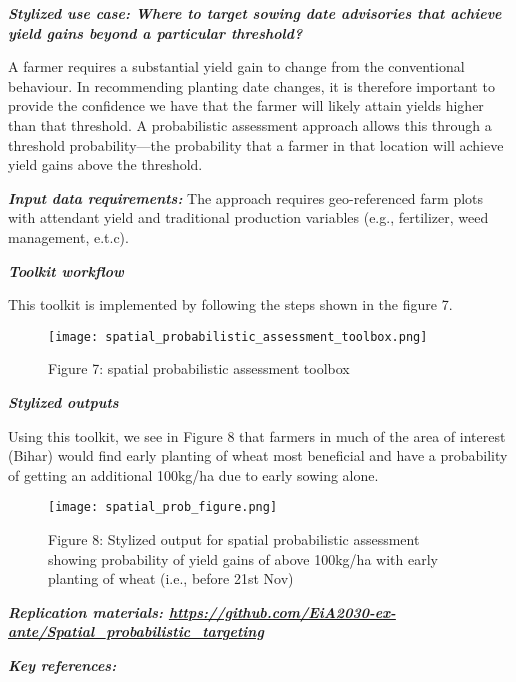 \documentclass[
  letterpaper,
  DIV=11,
  numbers=noendperiod]{scrreprt}
\begin{document}
\textbf{\emph{Stylized use case: Where to target sowing date advisories
that achieve yield gains beyond a particular threshold?}}

A farmer requires a substantial yield gain to change from the
conventional behaviour. In recommending planting date changes, it is
therefore important to provide the confidence we have that the farmer
will likely attain yields higher than that threshold. A probabilistic
assessment approach allows this through a threshold probability---the
probability that a farmer in that location will achieve yield gains
above the threshold.

\textbf{\emph{Input data requirements:}} The approach requires
geo-referenced farm plots with attendant yield and traditional
production variables (e.g., fertilizer, weed management, e.t.c).

\textbf{\emph{Toolkit workflow}}

This toolkit is implemented by following the steps shown in the figure
7.

\begin{figure}[H]

{\centering \texttt{[image: spatial\_probabilistic\_assessment\_toolbox.png]}

}

\caption{Figure 7: spatial probabilistic assessment toolbox}

\end{figure}%

\textbf{\emph{Stylized outputs}}

Using this toolkit, we see in Figure 8 that farmers in much of the area
of interest (Bihar) would find early planting of wheat most beneficial
and have a probability of getting an additional 100kg/ha due to early
sowing alone.

\begin{figure}[H]

{\centering \texttt{[image: spatial\_prob\_figure.png]}

}

\caption{Figure 8: Stylized output for spatial probabilistic assessment
showing probability of yield gains of above 100kg/ha with early planting
of wheat (i.e., before 21st Nov)}

\end{figure}%

\textbf{\emph{Replication materials:
\url{https://github.com/EiA2030-ex-ante/Spatial_probabilistic_targeting}}}

\textbf{\emph{Key references:}}
\end{document}
